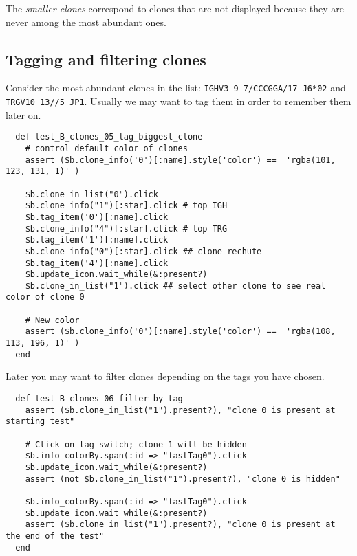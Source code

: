The \textit{smaller clones} correspond to clones that are not displayed
because they are never among the most abundant ones.


\subsection{Tagging and filtering clones}

Consider the most abundant clones in the list:  \texttt{IGHV3-9 7/CCCGGA/17 J6*02} and  \texttt{TRGV10 13//5 JP1}.
Usually we may want to tag them in order to remember them later on.

\begin{verbatim}
  def test_B_clones_05_tag_biggest_clone
    # control default color of clones
    assert ($b.clone_info('0')[:name].style('color') ==  'rgba(101, 123, 131, 1)' )

    $b.clone_in_list("0").click
    $b.clone_info("1")[:star].click # top IGH
    $b.tag_item('0')[:name].click
    $b.clone_info("4")[:star].click # top TRG 
    $b.tag_item('1')[:name].click
    $b.clone_info("0")[:star].click ## clone rechute
    $b.tag_item('4')[:name].click
    $b.update_icon.wait_while(&:present?)
    $b.clone_in_list("1").click ## select other clone to see real color of clone 0

    # New color
    assert ($b.clone_info('0')[:name].style('color') ==  'rgba(108, 113, 196, 1)' )
  end
\end{verbatim}

Later you may want to filter clones depending on the tags you have chosen.


\begin{verbatim}
  def test_B_clones_06_filter_by_tag
    assert ($b.clone_in_list("1").present?), "clone 0 is present at starting test"

    # Click on tag switch; clone 1 will be hidden
    $b.info_colorBy.span(:id => "fastTag0").click
    $b.update_icon.wait_while(&:present?)
    assert (not $b.clone_in_list("1").present?), "clone 0 is hidden"

    $b.info_colorBy.span(:id => "fastTag0").click
    $b.update_icon.wait_while(&:present?)
    assert ($b.clone_in_list("1").present?), "clone 0 is present at the end of the test"
  end
\end{verbatim}

